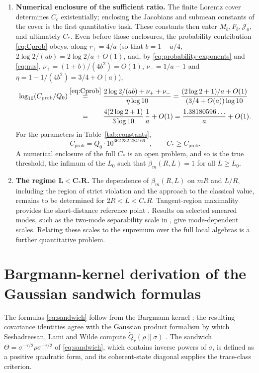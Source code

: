 \documentclass[11pt]{amsart}
\numberwithin{equation}{section}
\theoremstyle{definition}
\newcommand{\Qtil}{\widetilde Q}
\begin{document}
\begin{enumerate}[label=\textup{(\arabic*)},leftmargin=*]
\item \textbf{Numerical enclosure of the sufficient ratio.}
The finite Lorentz cover determines \(C_c\) existentially; enclosing
the Jacobians and submean constants of the cover is the first
quantitative task.
These constants then enter \(M_b,F_b,\mathcal J_0\), and ultimately \(C_*\).
Even before those enclosures, the probability contribution
\eqref{eq:Cprob} obeys, along \(r_+=4/a\) (so that \(b=1-a/4\),
\(2\log2/(ab)=2\log2/a+O(1)\), and, by \eqref{eq:probability-exponents}
and \eqref{eq:nus}, \(\nu_+=(1+b)/(4b^2)=O(1)\), \(\nu_-=1/a-1\) and
\(\eta=1-1/(4b^2)=3/4+O(a)\)),
\begin{align*}
 \log_{10}(C_{\mathrm{prob}}/Q_0)
 &\overset{\eqref{eq:Cprob}}{=}
 \frac{2\log2/(ab)+\nu_++\nu_-}{\eta\log10}
 =\frac{(2\log2+1)/a+O(1)}{(3/4+O(a))\log10}\\
 &\overset{\phantom{\eqref{eq:Cprob}}}{=}
 \frac{4(2\log2+1)}{3\log10}\,\frac1a+O(1)
 =
 \frac{1.38180596\ldots}{a}+O(1).
\end{align*}
For the parameters in Table~\ref{tab:constants},
\[
 C_{\mathrm{prob}}
 =Q_0\cdot10^{362\,232.284166\ldots},
 \qquad C_*\ge C_{\mathrm{prob}}.
\]
A numerical enclosure of the full \(C_*\) is an open
problem, and so is the true threshold, the infimum of the \(L_0\) such
that \(\beta_m(R,L)=1\) for all \(L\ge L_0\).

\item \textbf{The regime \(\boldsymbol{L<C_*R}\).}
The dependence of \(\beta_m(R,L)\) on \(mR\) and \(L/R\), including
the region of strict violation and the approach to the classical
value, remains to be determined for \(2R<L<C_*R\).
Tangent-region maximality provides the short-distance reference
point \cite{SW88}. Results on selected smeared modes, such as the
two-mode separability scale in \cite{Zych10}, give mode-dependent
scales. Relating these scales to the
supremum over the full local algebras is a further quantitative
problem.
\end{enumerate}

\appendix
\section{Bargmann-kernel derivation of the Gaussian sandwich formulas}
\label{app:gaussian}

The formulas \eqref{eq:sandwich} follow from the Bargmann kernel
\cite{Bargmann61}; the resulting covariance identities agree with the
Gaussian product formalism by which Seshadreesan, Lami and Wilde
compute \(\Qtil_r(\rho\|\sigma)\) \cite[Theorem~22]{SLW18}. The sandwich
\(\Theta=\sigma^{-\tau/2}\rho\sigma^{-\tau/2}\) of \eqref{eq:sandwich},
which contains inverse powers of \(\sigma\), is defined as a positive
quadratic form, and its coherent-state diagonal supplies the trace-class
criterion.
\end{document}
